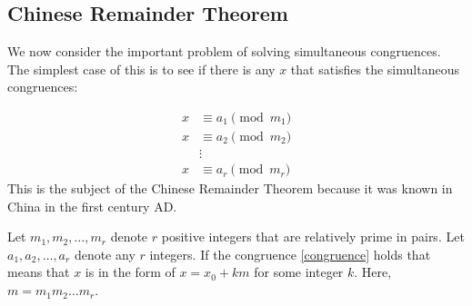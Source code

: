 \documentclass[11pt]{article}
\begin{document}
\subsection{Chinese Remainder Theorem}
We now consider the important problem of solving simultaneous congruences. The
simplest case of this is to see if there is any \(x\) that satisfies the
simultaneous congruences:

\[
    \begin{aligned}\label{congruence}
        x & \equiv a_1 \pmod{m_1} \\
        x & \equiv a_2 \pmod{m_2} \\
          & \vdots                \\
        x & \equiv a_r \pmod{m_r}
    \end{aligned}
\]
This is the subject of the Chinese Remainder Theorem because it was known in
China in the first century AD.

\begin{theorem}\label{2.18}
    Let \(m_1, m_2, \ldots, m_r\) denote \(r\) positive integers that are relatively prime in pairs. Let \(a_1, a_2, \ldots, a_r\) denote any \(r\) integers. If the congruence \ref{congruence} holds that means that \(x\) is in the form of \(x = x_0 + km\) for some integer \(k\). Here, \(m = m_1 m_2 \ldots m_r\).
\end{theorem}
\end{document}
